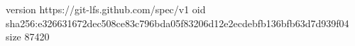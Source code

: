 version https://git-lfs.github.com/spec/v1
oid sha256:e326631672dec508ce83c796bda05f83206d12e2ecdebfb136bfb63d7d939f04
size 87420
